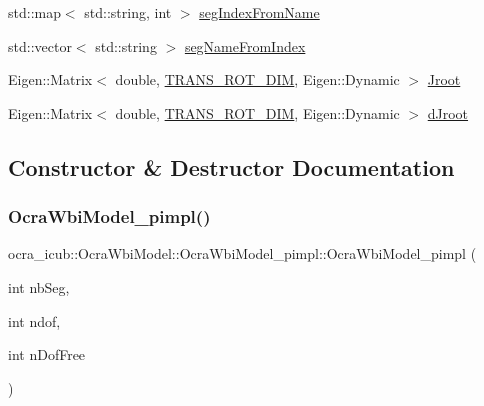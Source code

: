 \begin{DoxyCompactItemize}
\item 
std\+::map$<$ std\+::string, int $>$ \hyperlink{structOcraWbiModel_1_1OcraWbiModel__pimpl_ad172a7f70ea862fa849e859dc3c8e4f1}{seg\+Index\+From\+Name}
\item 
std\+::vector$<$ std\+::string $>$ \hyperlink{structOcraWbiModel_1_1OcraWbiModel__pimpl_ad1592df54a2ce8043dc2bc050fd61905}{seg\+Name\+From\+Index}
\item 
Eigen\+::\+Matrix$<$ double, \hyperlink{OcraWbiModel_8cpp_ab4a87cb824ceff256c6b8bce7701af58}{T\+R\+A\+N\+S\+\_\+\+R\+O\+T\+\_\+\+D\+IM}, Eigen\+::\+Dynamic $>$ \hyperlink{structOcraWbiModel_1_1OcraWbiModel__pimpl_a4a70bcc50b618443daf9fed6f5303403}{Jroot}
\item 
Eigen\+::\+Matrix$<$ double, \hyperlink{OcraWbiModel_8cpp_ab4a87cb824ceff256c6b8bce7701af58}{T\+R\+A\+N\+S\+\_\+\+R\+O\+T\+\_\+\+D\+IM}, Eigen\+::\+Dynamic $>$ \hyperlink{structOcraWbiModel_1_1OcraWbiModel__pimpl_afaba1181f7d08272208e372e2e23106c}{d\+Jroot}
\end{DoxyCompactItemize}


\subsection{Constructor \& Destructor Documentation}
\hypertarget{structOcraWbiModel_1_1OcraWbiModel__pimpl_a160077c75e80a7d0fcc8b2491de7f86c}{}\label{structOcraWbiModel_1_1OcraWbiModel__pimpl_a160077c75e80a7d0fcc8b2491de7f86c} 
\subsubsection{\texorpdfstring{Ocra\+Wbi\+Model\+\_\+pimpl()}{OcraWbiModel\_pimpl()}}
{\footnotesize\ttfamily ocra\+\_\+icub\+::\+Ocra\+Wbi\+Model\+::\+Ocra\+Wbi\+Model\+\_\+pimpl\+::\+Ocra\+Wbi\+Model\+\_\+pimpl (\begin{DoxyParamCaption}\item[{int}]{nb\+Seg,  }\item[{int}]{ndof,  }\item[{int}]{n\+Dof\+Free }\end{DoxyParamCaption})\hspace{0.3cm}{\ttfamily [inline]}}



